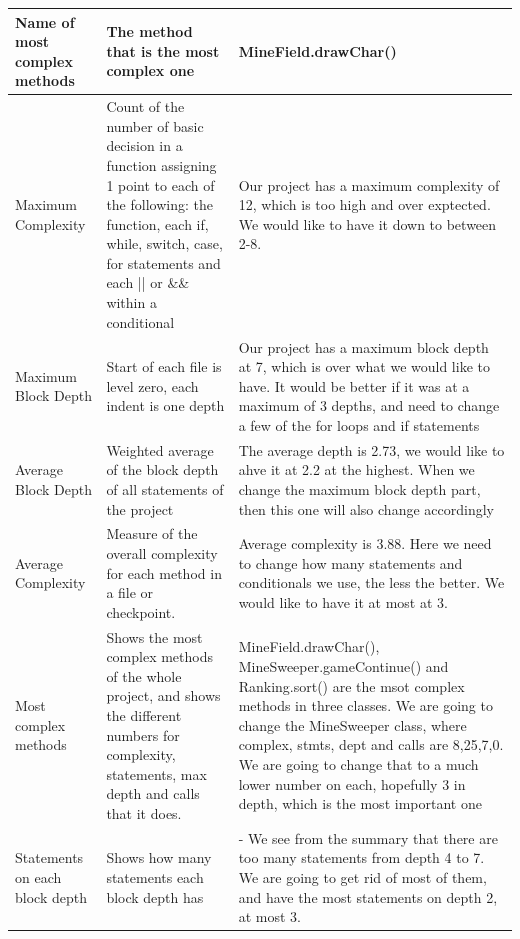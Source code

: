 \documentclass[UKenglish]{article}  %
\begin{document}
\begin{longtable}[H]{| m{1in} |  m{2in} | m{2in} |}
       \hline
       Name of most complex methods & The method that is the most complex one & MineField.drawChar()\\
       \hline
       Maximum Complexity & Count of the number of basic decision in a function assigning 1 point to each of the following: the function, each if, while, switch, case, for statements and each || or \&\& within a conditional & Our project has a maximum complexity of 12, which is too high and over exptected. We would like to have it down to between 2-8. \\
       \hline
       Maximum Block Depth & Start of each file is level zero, each indent is one depth & Our project has a maximum block depth at 7, which is over what we would like to have. It would be better if it was at a maximum of 3 depths, and need to change a few of the for loops and if statements \\
       \hline
       Average Block Depth & Weighted average of the block depth of all statements of the project & The average depth is 2.73, we would like to ahve it at 2.2 at the highest. When we change the maximum block depth part, then this one will also change accordingly \\
       \hline
       Average Complexity & Measure of the overall complexity for each method in a file or checkpoint. & Average complexity is 3.88. Here we need to change how many statements and conditionals we use, the less the better. We would like to have it at most at 3.\\
       \hline
       Most complex methods & Shows the most complex methods of the whole project, and shows the different numbers for complexity, statements, max depth and calls that it does. & MineField.drawChar(), MineSweeper.gameContinue() and Ranking.sort() are the msot complex methods in three classes. We are going to change the MineSweeper class, where complex, stmts, dept and calls are 8,25,7,0. We are going to change that to a much lower number on each, hopefully 3 in depth, which is the most important one\\ 
       \hline
       Statements on each block depth & Shows how many statements each block depth has & - We see from the summary that there are too many statements from depth 4 to 7. We are going to get rid of most of them, and have the most statements on depth 2, at most 3. \\
       \hline
\end{longtable}
\end{document}
